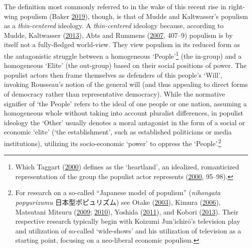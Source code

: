\documentclass[10pt,british,A4paper,twoside]{memoir}
\begin{document}
The definition most commonly referred to in the wake of this recent rise
in right-wing populism (Baker
\protect\hyperlink{ref-baker_we_2019}{2019}), though, is that of Mudde
and Kaltwasser's populism as a \emph{thin-centered} ideology. A
\emph{thin-centered} ideology because, according to Mudde, Kaltwasser
(\protect\hyperlink{ref-mudde_oxford_2013}{2013}), Abts and Rummens
(\protect\hyperlink{ref-abts_populism_2007}{2007}, 407--9) populism is
by itself not a fully-fledged world-view. They view populism in its
reduced form as the antagonistic struggle between a homogeneous
`People'\footnote{Which Taggart
  (\protect\hyperlink{ref-taggart_populism_2000}{2000}) defines as the
  `heartland', an idealized, romanticized representation of the group
  the populist actor represents
  (\protect\hyperlink{ref-taggart_populism_2000}{2000}, 95--98).} (the
in-group) and a homogeneous `Elite' (the out-group) based on their
social positions of power. The populist actors then frame themselves as defenders of this people's `Will', invoking Rousseau's notion of the
general will (and thus appealing to direct forms of democracy rather
than representative democracy). While the normative signifier of `the
People' refers to the ideal of one people or one nation, assuming a
homogeneous whole without taking into account pluralist differences, in
populist ideology the `Other' usually denotes a moral antagonist in the
form of a social or economic `elite' (`the establishment', such as
established politicians or media institutions), utilizing its
socio-economic `power' to oppress the `People'.\footnote{For research on
  a so-called ``Japanese model of populism'' (\emph{nihongata
  popyurizumu} 日本型ポピュリズム) see Otake
  (\protect\hyperlink{ref-otake__2003}{2003}), Kimura
  (\protect\hyperlink{ref-kimura__2006}{2006}), Matsutani Mitsuru
  (\protect\hyperlink{ref-matsutani__2009}{2009};
  \protect\hyperlink{ref-matsutani_eng:_2010}{2010}), Yoshida
  (\protect\hyperlink{ref-yoshida__2011}{2011}), and Kobori
  (\protect\hyperlink{ref-kobori_populism_2013}{2013}). Their respective
  research typically begin with Koizumi Jun'ichirō's television play and
  utilization of so-called `wide-shows' and his utilization of
  television as a starting point, focusing on a neo-liberal economic
  populism.}
\end{document}
